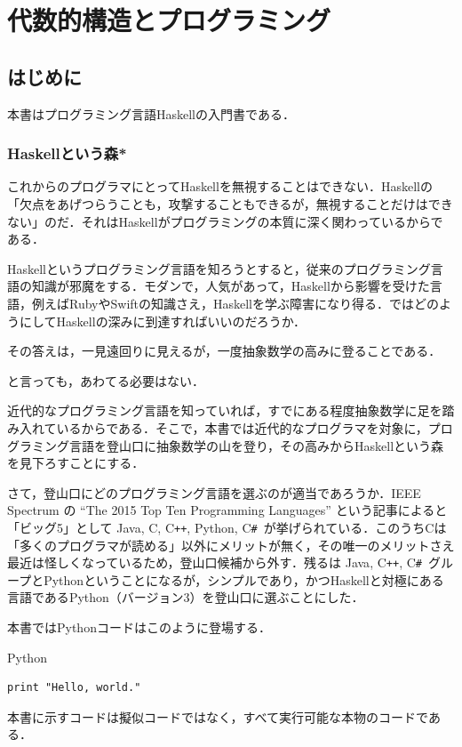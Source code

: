 \documentclass[a4paper]{jsbook}
\newcommand{\programminglanguage}[1]{\textsf{#1}}
\newcommand{\clang}{\programminglanguage{C}}
\newcommand{\csharp}{\programminglanguage{C}\texttt{\#}}
\newcommand{\cxx}{\programminglanguage{C}\texttt{++}}
\newcommand{\haskell}{\programminglanguage{Haskell}}
\newcommand{\java}{\programminglanguage{Java}}
\newcommand{\python}{\programminglanguage{Python}}
\newcommand{\ruby}{\programminglanguage{Ruby}}
\newcommand{\swift}{\programminglanguage{Swift}}
\newenvironment{leader}{\begingroup}{\endgroup}
\newenvironment{pythoncode}{\begin{itembox}[r]{\python}}{\end{itembox}}
\begin{document}
\part{代数的構造とプログラミング}

\chapter{はじめに}

\begin{leader}
本書はプログラミング言語\haskell の入門書である．
\end{leader}

\section{\haskell という森*}

これからのプログラマにとって\haskell を無視することはできない．\haskell の「欠点をあげつらうことも，攻撃することもできるが，無視することだけはできない」のだ．それは\haskell がプログラミングの本質に深く関わっているからである．

\haskell というプログラミング言語を知ろうとすると，従来のプログラミング言語の知識が邪魔をする．モダンで，人気があって，\haskell から影響を受けた言語，例えば\ruby や\swift の知識さえ，\haskell を学ぶ障害になり得る．ではどのようにして\haskell の深みに到達すればいいのだろうか．

その答えは，一見遠回りに見えるが，一度抽象数学の高みに登ることである．

と言っても，あわてる必要はない．

近代的なプログラミング言語を知っていれば，すでにある程度抽象数学に足を踏み入れているからである．そこで，本書では近代的なプログラマを対象に，プログラミング言語を登山口に抽象数学の山を登り，その高みから\haskell という森を見下ろすことにする．


さて，登山口にどのプログラミング言語を選ぶのが適当であろうか．IEEE Spectrum の ``The 2015 Top Ten Programming Languages'' という記事によると「ビッグ5」として \java, \clang, \cxx, \python, \csharp\ が挙げられている．このうち\clang は「多くのプログラマが読める」以外にメリットが無く，その唯一のメリットさえ最近は怪しくなっているため，登山口候補から外す．残るは \java, \cxx, \csharp\ グループと\python ということになるが，シンプルであり，かつ\haskell と対極にある言語である\python（バージョン3）を登山口に選ぶことにした．

本書では\python コードはこのように登場する．
\begin{pythoncode}
\begin{verbatim}
print "Hello, world."
\end{verbatim}
\end{pythoncode}
本書に示すコードは擬似コードではなく，すべて実行可能な本物のコードである．
\end{document}
